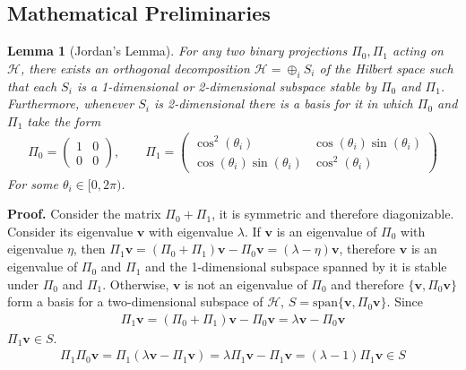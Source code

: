 \documentclass{article}
\newtheorem{lem}[thm]{Lemma}
\begin{document}
\subsection{Mathematical Preliminaries}
\begin{lem}[Jordan's Lemma]\label{jordan}
For any two binary projections $\Pi_{0}, \Pi_{1}$ acting on $\mathcal{H}$, there exists an orthogonal decomposition $\mathcal{H}=\oplus_{i}S_{i}$ of the Hilbert space such that each $S_{i}$ is a 1-dimensional or 2-dimensional subspace stable by $\Pi_{0}$ and $\Pi_{1}$. Furthermore, whenever $S_{i}$ is 2-dimensional there is a basis for it in which $\Pi_{0}$ and $\Pi_{1}$ take the form
\begin{align}\Pi_{0}=\begin{pmatrix}1 & 0\\0 & 0\end{pmatrix},\qquad \Pi_{1}=\begin{pmatrix}\cos^{2}(\theta_{i}) & \cos(\theta_{i})\sin(\theta_{i})\\ \cos(\theta_{i})\sin(\theta_{i})& \cos^{2}(\theta_{i})\end{pmatrix}\end{align}
For some $\theta_{i}\in [0,2\pi)$.
\end{lem}
\textbf{Proof.} Consider the matrix $\Pi_{0}+\Pi_{1}$, it is symmetric and therefore diagonizable. Consider its eigenvalue $\textbf{v}$ with eigenvalue $\lambda$. If $\textbf{v}$ is an eigenvalue of $\Pi_{0}$ with eigenvalue $\eta$, then $\Pi_{1}\textbf{v} = (\Pi_{0}+\Pi_{1})\textbf{v} - \Pi_{0}\textbf{v} = (\lambda - \eta)\textbf{v}$, therefore $\textbf{v}$ is an eigenvalue of $\Pi_{0}$ and $\Pi_{1}$ and the 1-dimensional subspace spanned by it is stable under $\Pi_{0}$ and $\Pi_{1}$. Otherwise, $\textbf{v}$ is not an eigenvalue of $\Pi_{0}$ and therefore $\{\textbf{v}, \Pi_{0}\textbf{v}\}$ form a basis for a two-dimensional subspace of $\mathcal{H}$, $S=\mathrm{span}\{\textbf{v}, \Pi_{0}\textbf{v}\}$. Since \begin{align}
    \Pi_{1}\textbf{v} = (\Pi_{0} + \Pi_{1})\textbf{v} - \Pi_{0}\textbf{v} = \lambda \textbf{v} - \Pi_{0}\textbf{v}
\end{align} $\Pi_{1}\textbf{v} \in S$. \begin{align}
    \Pi_{1}\Pi_{0}\textbf{v} = \Pi_{1}(\lambda\textbf{v} - \Pi_{1}\textbf{v}) = \lambda \Pi_{1}\textbf{v} - \Pi_{1}\textbf{v} = (\lambda - 1)\Pi_{1}\textbf{v} \in S
\end{align}
\end{document}
